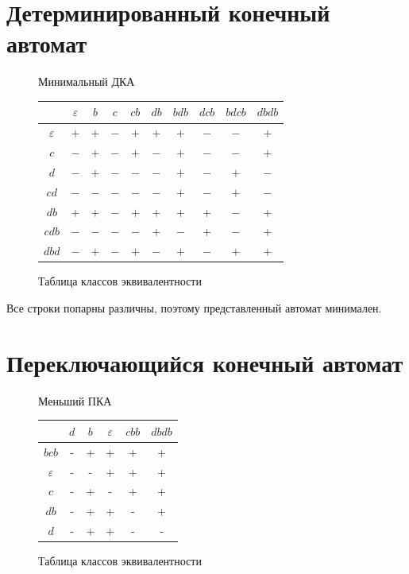 \documentclass[a4paper, 14pt]{extarticle}
\begin{document}
\section{Детерминированный конечный автомат}
\begin{figure}[H]
\centering
\scalebox{1.2}{}
\caption{Минимальный ДКА}
\end{figure}
\begin{figure}[H]
\centering
\begin{tabular}{|c|c|c|c|c|c|c|c|c|c|}
\hline
 & $\varepsilon$ & $b$ & $c$ & $cb$ & $db$ & $bdb$ & $dcb$ & $bdcb$ & $dbdb$ \\
\hline
$\varepsilon$ & $+$ & $+$ & $-$ & $+$ & $+$ & $+$ & $-$ & $-$ & $+$ \\
\hline
$c$ & $-$ & $+$ & $-$ & $+$ & $-$ & $+$ & $-$ & $-$ & $+$ \\
\hline
$d$ & $-$ & $+$ & $-$ & $-$ & $-$ & $+$ & $-$ & $+$ & $-$ \\
\hline
$cd$ & $-$ & $-$ & $-$ & $-$ & $-$ & $+$ & $-$ & $+$ & $-$ \\
\hline
$db$ & $+$ & $+$ & $-$ & $+$ & $+$ & $+$ & $+$ & $-$ & $+$ \\
\hline
$cdb$ & $-$ & $-$ & $-$ & $-$ & $+$ & $-$ & $+$ & $-$ & $+$ \\
\hline
$dbd$ & $-$ & $+$ & $-$ & $+$ & $-$ & $+$ & $-$ & $+$ & $+$ \\
\hline
\end{tabular}
\caption{Таблица классов эквивалентности}
\end{figure}
Все строки попарны различны, поэтому представленный автомат минимален.

\section{Переключающийся конечный автомат}
\begin{figure}[H]
\centering

\caption{Меньший ПКА}
\end{figure}
\begin{figure}[H]
\centering
\begin{tabular}{|c|c|c|c|c|c|}
\hline
 & $d$ & $b$ & $\varepsilon$ & $cbb$ & $dbdb$ \\
\hline
$bcb$       & - & + & + & + & + \\
\hline
$\varepsilon$ & - & - & + & + & + \\
\hline
$c$        & - & + & - & + & + \\
\hline
$db$       & - & + & + & - & + \\
\hline
$d$       & - & + & + & - & - \\
\hline
\end{tabular}
\caption{Таблица классов эквивалентности}
\end{figure}
\end{document}
